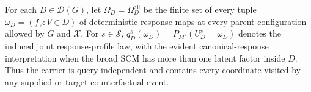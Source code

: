 For each \(D\in\mathcal D(G)\), let \(\Omega_D=\Omega_D^{\mathrm{all}}\) be the finite set of every tuple \(\omega_D=(f_V:V\in D)\) of deterministic response maps at every parent configuration allowed by \(G\) and \(\mathcal X\).  For \(s\in\mathcal S\), \(q_D^s(\omega_D)=P_{M^s}(U_D^s=\omega_D)\) denotes the induced joint response-profile law, with the evident canonical-response interpretation when the broad SCM has more than one latent factor inside \(D\).  Thus the carrier is query independent and contains every coordinate visited by any supplied or target counterfactual event.
